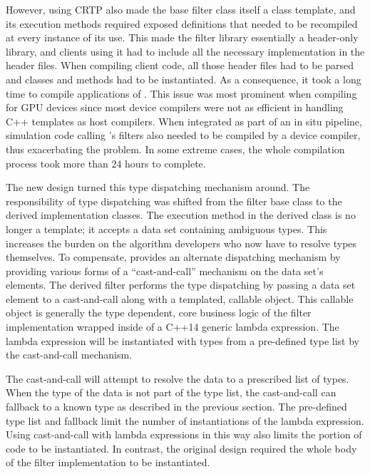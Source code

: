 However, using CRTP also made the base filter class itself a class template, and its execution methods required exposed definitions that needed to be recompiled at every instance of its use.
This made the \vtkm filter library essentially a header-only library, and clients using it had to include all the necessary implementation in the header files.
When compiling client code, all those header files had to be parsed and classes and methods had to be instantiated.
As a consequence, it took a long time to compile applications of \vtkm.
This issue was most prominent when compiling for GPU devices since most device compilers were not as efficient in handling C++ templates as host compilers.
When integrated as part of an in situ pipeline, simulation code calling \vtkm's filters also needed to be compiled by a device compiler, thus exacerbating the problem.
In some extreme cases, the whole compilation process took more than 24 hours to complete.

The new design turned this type dispatching mechanism around.
The responsibility of type dispatching was shifted from the filter base class to the derived implementation classes.
The execution method in the derived class is no longer a template; it accepts a data set containing ambiguous types.
This increases the burden on the algorithm developers who now have to resolve types themselves.
To compensate, \vtkm provides an alternate dispatching mechanism by providing various forms of a ``cast-and-call'' mechanism on the data set's elements.
The derived filter performs the type dispatching by passing a data set element to a cast-and-call along with a templated, callable object.
This callable object is generally the type dependent, core business logic of the filter implementation wrapped inside of a C++14 generic lambda expression.
The lambda expression will be instantiated with types from a pre-defined type list by the cast-and-call mechanism.

The cast-and-call will attempt to resolve the data to a prescribed list of types.
When the type of the data is not part of the type list, the cast-and-call can fallback to a known type as described in the previous  section.
The pre-defined type list and fallback limit the number of instantiations of the lambda expression.
Using cast-and-call with lambda expressions in this way also limits the portion of code to be instantiated.
In contrast, the original design required the whole body of the filter implementation to be instantiated.

